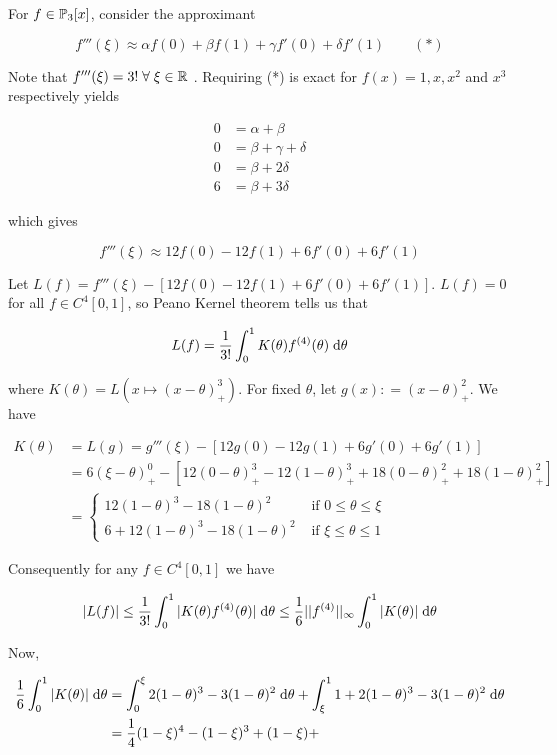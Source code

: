 \documentclass[a4paper]{article}
\begin{document}
For $ f \in \P_{3}[x] $, consider the approximant

\[ f'''(\xi) \approx \alpha f(0) + \beta f(1) + \gamma f'(0) + \delta f'(1)  \qquad (*) \]

Note that $ f'''(\xi) = 3! \; \forall \; \xi \in \R $  . Requiring (*) is exact for $ f(x) = 1, x, x^{2} $ and $ x^{3} $ respectively yields

\begin{align*}
0 & = \alpha + \beta \\
0 & = \beta + \gamma + \delta \\
0 & = \beta + 2\delta \\
6 & = \beta + 3 \delta  
\end{align*}

which gives


\[ f'''(\xi) \approx 12 f(0) - 12 f(1) + 6 f'(0) + 6 f'(1)  \]

Let $ L(f) =  f'''(\xi) - [12 f(0) - 12 f(1) + 6 f'(0) + 6 f'(1) ] $. $ L(f) = 0 $ for all $ f \in C^{4}[0,1] $, so Peano Kernel theorem tells us that 

\[ L(f) = \frac{1}{3!}  \int_{0}^{1} K(\theta) f^{(4)}(\theta) \; \d \theta \]


where $ K(\theta) = L(x \mapsto (x - \theta)_{+}^{3} ) $. For fixed $ \theta $,  let $ g(x) : = (x - \theta)_{+}^{2} $. We have

\begin{align*}
K(\theta) & = L(g) = g'''(\xi) - [ 12g(0) - 12g(1) + 6g'(0) + 6g'(1)  ]   \\
& = 6 (\xi - \theta)_{+}^{0}   - [ 12 (0 - \theta)_{+}^{3} - 12 (1 - \theta)_{+}^{3} + 18 (0 - \theta)_{+}^{2} + 18 (1 - \theta)_{+}^{2}  ] \\
& = \begin{cases} 12(1-\theta)^{3} - 18(1-\theta)^{2}  & \text{ if } 0 \leq \theta \leq \xi \\ 6 + 12(1-\theta)^{3} - 18(1-\theta)^{2}  &   \text{ if }  \xi \leq \theta \leq 1 \end{cases}
\end{align*}

Consequently for any $ f \in C^{4}[0,1] $ we have



\[ | L(f) | \leq \frac{1}{3!} \int_{0}^{1} |  K(\theta) f^{(4)}(\theta) | \; \d \theta \leq \frac{1}{6} | | f^{(4)} | |_{\infty} \int_{0}^{1} | K(\theta) | \; \d \theta  \]

Now, 

\begin{align*}
\frac{1}{6} \int_{0}^{1} | K(\theta) | \; \d \theta & = \int_{0}^{\xi} 2(1-\theta)^{3} - 3(1-\theta)^{2} \; \d \theta + \int_{\xi}^{1} 1 + 2(1-\theta)^{3} - 3(1-\theta)^{2} \; \d \theta \\
& = \frac{1}{4} (1 - \xi)^{4} - (1 - \xi)^{3} + (1 - \xi) + 
\end{align*}
\end{document}
